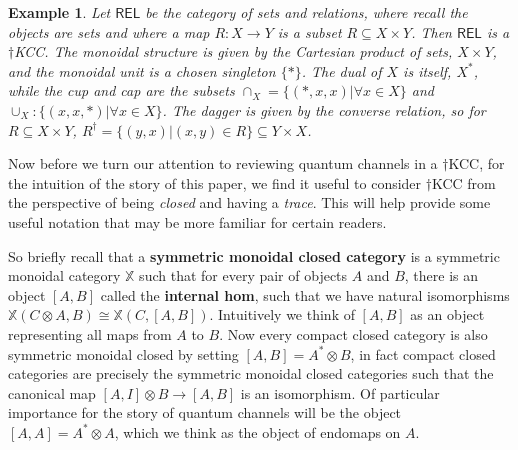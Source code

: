 \documentclass[submission,copyright,creativecommons]{eptcs}
\newtheorem{example}[observation]{Example}
\begin{document}
\begin{example} Let $\mathsf{REL}$ be the category of sets and relations, where recall the objects are sets and where a map $R: X \to Y$ is a subset $R \subseteq X \times Y$. Then $\mathsf{REL}$ is a $\dagger$KCC. The monoidal structure is given by the Cartesian product of sets, $X \times Y$, and the monoidal unit is a chosen singleton $\lbrace \ast \rbrace$. The dual of $X$ is itself, $X^\ast$, while the cup and cap are the subsets $\cap_X = \lbrace (\ast, x,x) \vert \forall x \in X \rbrace$ and $\cup_X: \lbrace (x,x,\ast) \vert \forall x \in X\rbrace$. The dagger is given by the converse relation, so for $R \subseteq X \times Y$, $R^\dagger = \lbrace (y,x) \vert (x,y) \in R \rbrace \subseteq Y \times X$. %
\end{example}

Now before we turn our attention to reviewing quantum channels in a $\dagger$KCC, for the intuition of the story of this paper, we find it useful to consider $\dagger$KCC from the perspective of being \textit{closed} and having a \textit{trace}. This will help provide some useful notation that may be more familiar for certain readers. 

So briefly recall that a \textbf{symmetric monoidal closed category} is a symmetric monoidal category $\mathbb{X}$ such that for every pair of objects $A$ and $B$, there is an object $[A,B]$ called the \textbf{internal hom}, such that we have natural isomorphisms $\mathbb{X}(C \otimes A, B) \cong \mathbb{X}(C, [A,B])$. Intuitively we think of $[A,B]$ as an object representing all maps from $A$ to $B$. Now every compact closed category is also symmetric monoidal closed by setting $[A,B] = A^\ast \otimes B$, in fact compact closed categories are precisely the symmetric monoidal closed categories such that the canonical map $[A,I] \otimes B \to [A,B]$ is an isomorphism. Of particular importance for the story of quantum channels will be the object $[A,A]= A^\ast \otimes A$, which we think as the object of endomaps on $A$. 
\end{document}

